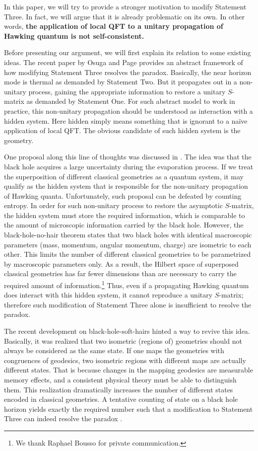 \documentclass[aps,showpacs,twocolumn,floats,prd,superscriptaddress,nofootinbib]{revtex4-1}
\begin{document}
In this paper, we will try to provide a stronger motivation to modify Statement Three. 
In fact, we will argue that it is already problematic on its own. 
In other words, {\bf the application of local QFT to a unitary propagation of Hawking quantum is not self-consistent. } 

Before presenting our argument, we will first explain its relation to some existing ideas.
The recent paper by Osuga and Page \cite{OsuPag16} provides an abstract framework of how modifying Statement Three resolves the paradox.
Basically, the near horizon mode is thermal as demanded by Statement Two.
But it propagates out in a non-unitary process, gaining the appropriate information to restore a unitary $S$-matrix as demanded by Statement One. 
For such abstract model to work in practice, this non-unitary propagation should be understood as interaction with a hidden system.
Here hidden simply means something that is ignorant to a na\"ive application of local QFT.
The obvious candidate of such hidden system is the geometry.

One proposal along this line of thoughts was discussed in \cite{NomVar12}. 
The idea was that the black hole acquires a large uncertainty during the evaporation process. 
If we treat the superposition of different classical geometries as a quantum system, it may qualify as the hidden system that is responsible for the non-unitary propagation of Hawking quanta. 
Unfortunately, such proposal can be defeated by counting entropy.
In order for such non-unitary process to restore the asymptotic $S$-matrix, the hidden system must store the required information, which is comparable to the amount of microscopic information carried by the black hole.
However, the black-hole-no-hair theorem states that two black holes with identical macroscopic parameters (mass, momentum, angular momentum, charge) are isometric to each other. 
This limits the number of different classical geometries to be parametrized by macroscopic parameters only.
As a result, the Hilbert space of superposed classical geometries has far fewer dimensions than are necessary to carry the required amount of information.\footnote{We thank Raphael Bousso for private communication.}
Thus, even if a propagating Hawking quantum does interact with this hidden system, it cannot reproduce a unitary $S$-matrix; therefore such modification of Statement Three alone is insufficient to resolve the paradox.

The recent development on black-hole-soft-hairs \cite{HawPer16} hinted a way to revive this idea.
Basically, it was realized that two isometric (regions of) geometries should not always be considered as the same state.
If one maps the geometries with congruences of geodesics, two isometric regions with different maps are actually different states.
That is because changes in the mapping geodesics are measurable memory effects, and a consistent physical theory must be able to distinguish them.
This realization dramatically increases the number of different states encoded in classical geometries.
A tentative counting of state on a black hole horizon yields exactly the required number such that a modification to Statement Three can indeed resolve the paradox \cite{HawPer16}.
\end{document}

